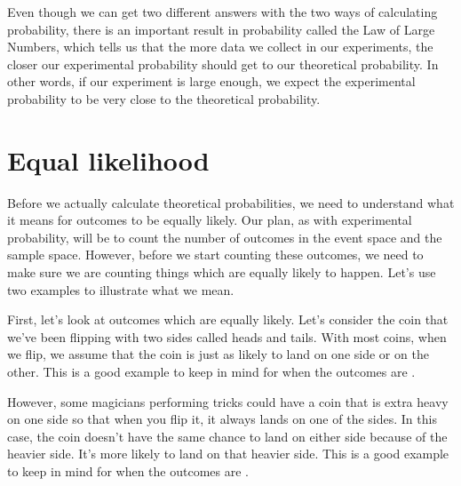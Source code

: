\documentclass{ximera}
\begin{document}
Even though we can get two different answers with the two ways of calculating probability, there is an important result in probability called the Law of Large Numbers, which tells us that the more data we collect in our experiments, the closer our experimental probability should get to our theoretical probability. In other words, if our experiment is large enough, we expect the experimental probability to be very close to the theoretical probability.



\section{Equal likelihood}
Before we actually calculate theoretical probabilities, we need to understand what it means for outcomes to be equally likely. Our plan, as with experimental probability, will be to count the number of outcomes in the event space and the sample space. However, before we start counting these outcomes, we need to make sure we are counting things which are equally likely to happen. Let's use two examples to illustrate what we mean.

\begin{example}
First, let's look at outcomes which are equally likely. Let's consider the coin that we've been flipping with two sides called heads and tails. With most coins, when we flip, we assume that the coin is just as likely to land on one side or on the other. This is a good example to keep in mind for when the outcomes are .

However, some magicians performing tricks could have a coin that is extra heavy on one side so that when you flip it, it always lands on one of the sides. In this case, the coin doesn't have the same chance to land on either side because of the heavier side. It's more likely to land on that heavier side. This is a good example to keep in mind for when the outcomes are .
\end{example}
\end{document}
